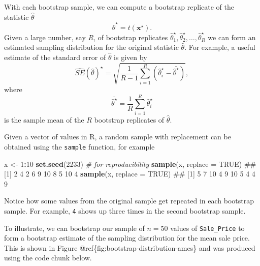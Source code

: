 \documentclass[]{book}
\newenvironment{Shaded}{\begin{snugshade}}{\end{snugshade}}
\newcommand{\CommentTok}[1]{\textcolor[rgb]{0.56,0.35,0.01}{\textit{#1}}}
\newcommand{\DataTypeTok}[1]{\textcolor[rgb]{0.13,0.29,0.53}{#1}}
\newcommand{\DecValTok}[1]{\textcolor[rgb]{0.00,0.00,0.81}{#1}}
\newcommand{\KeywordTok}[1]{\textcolor[rgb]{0.13,0.29,0.53}{\textbf{#1}}}
\newcommand{\NormalTok}[1]{#1}
\newcommand{\OperatorTok}[1]{\textcolor[rgb]{0.81,0.36,0.00}{\textbf{#1}}}
\newcommand{\OtherTok}[1]{\textcolor[rgb]{0.56,0.35,0.01}{#1}}
\newcommand{\StringTok}[1]{\textcolor[rgb]{0.31,0.60,0.02}{#1}}
\theoremstyle{definition}
\theoremstyle{definition}
\theoremstyle{definition}
\theoremstyle{remark}
\begin{document}
With each bootstrap sample, we can compute a bootstrap replicate of the
statistic \(\widehat{\theta}\) \[
  \widehat{\theta} ^ \star = t\left(\boldsymbol{x} ^ \star\right).
\] Given a large number, say \(R\), of bootstrap replicates
\(\widehat{\theta}_1 ^ \star, \widehat{\theta}_2 ^ \star, \dots, \widehat{\theta}_R ^ \star\)
we can form an estimated sampling distribution for the original
statistic \(\widehat{\theta}\). For example, a useful estimate of the
standard error of \(\widehat{\theta}\) is given by \[
  \widehat{SE}\left(\widehat{\theta}\right) ^ \star = \sqrt{\frac{1}{R - 1}\sum_{i = 1} ^ R\left(\widehat{\theta}_i ^ \star - \bar{\widehat{\theta} ^ \star}\right)},
\] where \[
\bar{\widehat{\theta} ^ \star} = \frac{1}{R}\sum_{i = 1} ^ R \widehat{\theta}_i ^ \star
\] is the sample mean of the \(R\) bootstrap replicates of
\(\widehat{\theta}\).

Given a vector of values in R, a random sample with replacement can be
obtained using the \texttt{sample} function, for example

\begin{Shaded}
\begin{Highlighting}[]
\NormalTok{x <-}\StringTok{ }\DecValTok{1}\OperatorTok{:}\DecValTok{10}
\KeywordTok{set.seed}\NormalTok{(}\DecValTok{2233}\NormalTok{)  }\CommentTok{# for reproducibility}
\KeywordTok{sample}\NormalTok{(x, }\DataTypeTok{replace =} \OtherTok{TRUE}\NormalTok{)}
\NormalTok{##  [1]  2  4  2  6  9 10  8  5 10  4}
\KeywordTok{sample}\NormalTok{(x, }\DataTypeTok{replace =} \OtherTok{TRUE}\NormalTok{)}
\NormalTok{##  [1]  5  7 10  4  9 10  5  4  4  9}
\end{Highlighting}
\end{Shaded}

Notice how some values from the original sample get repeated in each
bootstrap sample. For example, \texttt{4} shows up three times in the
second bootstrap sample.

To illustrate, we can bootstrap our sample of \(n = 50\) values of
\texttt{Sale\_Price} to form a bootstrap estimate of the sampling
distribution for the mean sale price. This is shown in Figure
@ref\{fig:bootstrap-distribution-ames\} and was produced using the code
chunk below.
\end{document}
